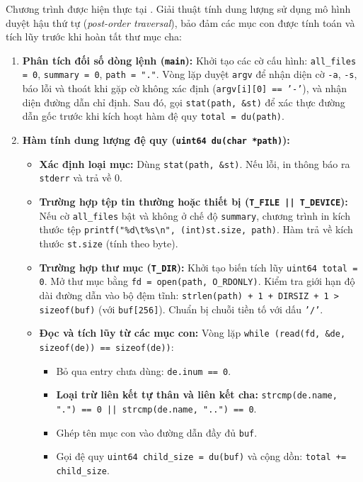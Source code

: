 \documentclass[12pt,a4paper]{article}
\begin{document}
Chương trình được hiện thực tại . Giải thuật tính dung lượng sử dụng mô hình duyệt hậu thứ tự (\textit{post-order traversal}), bảo đảm các mục con được tính toán và tích lũy trước khi hoàn tất thư mục cha:
\begin{enumerate}
  \item \textbf{Phân tích đối số dòng lệnh (\texttt{main}):}
  Khởi tạo các cờ cấu hình: \texttt{all\_files = 0}, \texttt{summary = 0}, \texttt{path = "."}. Vòng lặp duyệt \texttt{argv} để nhận diện cờ \texttt{-a}, \texttt{-s}, báo lỗi và thoát khi gặp cờ không xác định (\texttt{argv[i][0] == '-'}), và nhận diện đường dẫn chỉ định. Sau đó, gọi \texttt{stat(path, \&st)} để xác thực đường dẫn gốc trước khi kích hoạt hàm đệ quy \texttt{total = du(path)}.
  \item \textbf{Hàm tính dung lượng đệ quy (\texttt{uint64 du(char *path)}):}
  \begin{itemize}
    \item \textbf{Xác định loại mục:} Dùng \texttt{stat(path, \&st)}. Nếu lỗi, in thông báo ra \texttt{stderr} và trả về $0$.
    \item \textbf{Trường hợp tệp tin thường hoặc thiết bị (\texttt{T\_FILE || T\_DEVICE}):}
    Nếu cờ \texttt{all\_files} bật và không ở chế độ \texttt{summary}, chương trình in kích thước tệp \texttt{printf("\%d\textbackslash t\%s\textbackslash n", (int)st.size, path)}. Hàm trả về kích thước \texttt{st.size} (tính theo byte).
    \item \textbf{Trường hợp thư mục (\texttt{T\_DIR}):}
    Khởi tạo biến tích lũy \texttt{uint64 total = 0}. Mở thư mục bằng \texttt{fd = open(path, O\_RDONLY)}. Kiểm tra giới hạn độ dài đường dẫn vào bộ đệm tĩnh: \texttt{strlen(path) + 1 + DIRSIZ + 1 > sizeof(buf)} (với \texttt{buf[256]}). Chuẩn bị chuỗi tiền tố với dấu \texttt{'/'}.
    \item \textbf{Đọc và tích lũy từ các mục con:}
    Vòng lặp \texttt{while (read(fd, \&de, sizeof(de)) == sizeof(de))}:
    \begin{itemize}
      \item Bỏ qua entry chưa dùng: \texttt{de.inum == 0}.
      \item \textbf{Loại trừ liên kết tự thân và liên kết cha:} \texttt{strcmp(de.name, ".") == 0 || strcmp(de.name, "..") == 0}.
      \item Ghép tên mục con vào đường dẫn đầy đủ \texttt{buf}.
      \item Gọi đệ quy \texttt{uint64 child\_size = du(buf)} và cộng dồn: \texttt{total += child\_size}.

\end{itemize}
\end{itemize}
\end{enumerate}
\end{document}
